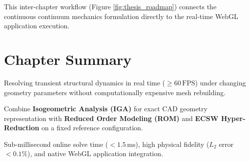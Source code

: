 This inter-chapter workflow (Figure \ref{fig:thesis_roadmap}) connects the continuous continuum mechanics formulation directly to the real-time WebGL application execution.
\section{Chapter Summary}
\begin{tcolorbox}[colback=lightbg, colframe=primaryblue, title=\textbf{Chapter Summary: Objectives \& Methodological Synergy}, fonttitle=\bfseries]
    \begin{description}[leftmargin=!, labelwidth=3.2cm]
        \item[\textbf{Challenge}] Resolving transient structural dynamics in real time ($\ge 60\,\text{FPS}$) under changing geometry parameters without computationally expensive mesh rebuilding.
        \item[\textbf{Core Idea}] Combine \textbf{Isogeometric Analysis (IGA)} for exact CAD geometry representation with \textbf{Reduced Order Modeling (ROM)} and \textbf{ECSW Hyper-Reduction} on a fixed reference configuration.
        \item[\textbf{Key Targets}] Sub-millisecond online solve time ($<1.5\,\text{ms}$), high physical fidelity ($L_2$ error $<0.1\%$), and native WebGL application integration.
    \end{description}
\end{tcolorbox}
